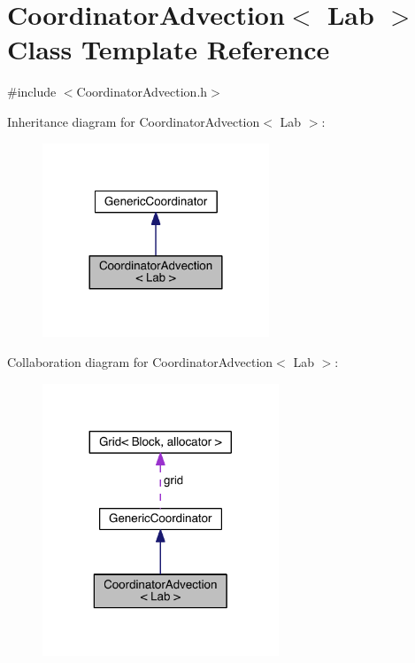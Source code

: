 \hypertarget{class_coordinator_advection}{}\section{Coordinator\+Advection$<$ Lab $>$ Class Template Reference}
\label{class_coordinator_advection}


{\ttfamily \#include $<$Coordinator\+Advection.\+h$>$}



Inheritance diagram for Coordinator\+Advection$<$ Lab $>$\+:\nopagebreak
\begin{figure}[H]
\begin{center}
\leavevmode
\includegraphics[width=192pt]{d6/d09/class_coordinator_advection__inherit__graph}
\end{center}
\end{figure}


Collaboration diagram for Coordinator\+Advection$<$ Lab $>$\+:\nopagebreak
\begin{figure}[H]
\begin{center}
\leavevmode
\includegraphics[width=200pt]{de/d4e/class_coordinator_advection__coll__graph}
\end{center}
\end{figure}
